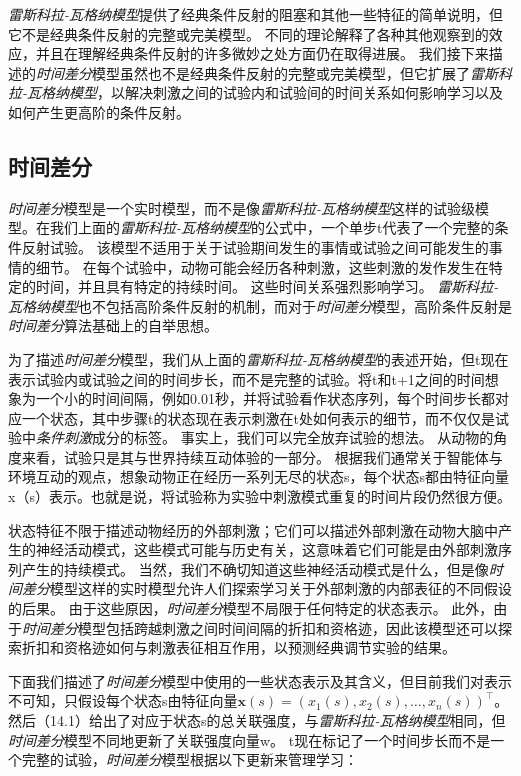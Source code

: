 \textit{雷斯科拉-瓦格纳模型}提供了经典条件反射的阻塞和其他一些特征的简单说明，但它不是经典条件反射的完整或完美模型。
不同的理论解释了各种其他观察到的效应，并且在理解经典条件反射的许多微妙之处方面仍在取得进展。
我们接下来描述的\textit{时间差分}模型虽然也不是经典条件反射的完整或完美模型，但它扩展了\textit{雷斯科拉-瓦格纳模型}，以解决刺激之间的试验内和试验间的时间关系如何影响学习以及如何产生更高阶的条件反射。


\subsection{时间差分}

\textit{时间差分}模型是一个实时模型，而不是像\textit{雷斯科拉-瓦格纳模型}这样的试验级模型。在我们上面的\textit{雷斯科拉-瓦格纳模型}的公式中，一个单步t代表了一个完整的条件反射试验。
该模型不适用于关于试验期间发生的事情或试验之间可能发生的事情的细节。
在每个试验中，动物可能会经历各种刺激，这些刺激的发作发生在特定的时间，并且具有特定的持续时间。
这些时间关系强烈影响学习。
\textit{雷斯科拉-瓦格纳模型}也不包括高阶条件反射的机制，而对于\textit{时间差分}模型，高阶条件反射是\textit{时间差分}算法基础上的自举思想。



为了描述\textit{时间差分}模型，我们从上面的\textit{雷斯科拉-瓦格纳模型}的表述开始，但t现在表示试验内或试验之间的时间步长，而不是完整的试验。将t和t+1之间的时间想象为一个小的时间间隔，例如0.01秒，并将试验看作状态序列，每个时间步长都对应一个状态，其中步骤t的状态现在表示刺激在t处如何表示的细节，而不仅仅是试验中\textit{条件刺激}成分的标签。
事实上，我们可以完全放弃试验的想法。
从动物的角度来看，试验只是其与世界持续互动体验的一部分。
根据我们通常关于智能体与环境互动的观点，想象动物正在经历一系列无尽的状态s，每个状态s都由特征向量x（s）表示。也就是说，将试验称为实验中刺激模式重复的时间片段仍然很方便。


状态特征不限于描述动物经历的外部刺激；它们可以描述外部刺激在动物大脑中产生的神经活动模式，这些模式可能与历史有关，这意味着它们可能是由外部刺激序列产生的持续模式。
当然，我们不确切知道这些神经活动模式是什么，但是像\textit{时间差分}模型这样的实时模型允许人们探索学习关于外部刺激的内部表征的不同假设的后果。
由于这些原因，\textit{时间差分}模型不局限于任何特定的状态表示。
此外，由于\textit{时间差分}模型包括跨越刺激之间时间间隔的折扣和资格迹，因此该模型还可以探索折扣和资格迹如何与刺激表征相互作用，以预测经典调节实验的结果。


下面我们描述了\textit{时间差分}模型中使用的一些状态表示及其含义，但目前我们对表示不可知，只假设每个状态s由特征向量$\mathbf{x}(s)=\left(x_{1}(s), x_{2}(s), \ldots, x_{n}(s)\right)^{\top}$。
然后（14.1）给出了对应于状态s的总关联强度，与\textit{雷斯科拉-瓦格纳模型}相同，但\textit{时间差分}模型不同地更新了关联强度向量w。
t现在标记了一个时间步长而不是一个完整的试验，\textit{时间差分}模型根据以下更新来管理学习：

